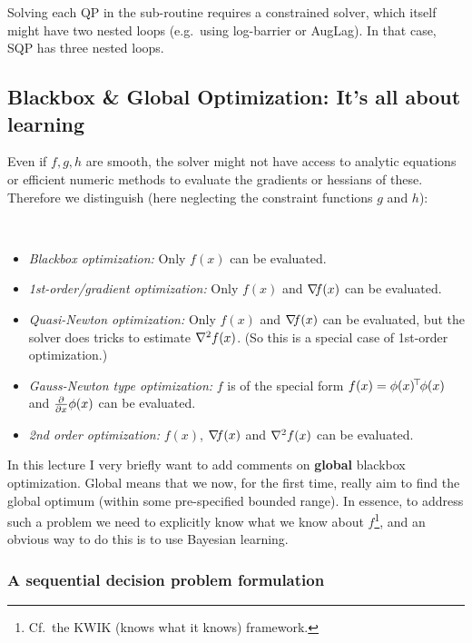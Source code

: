 Solving each QP in the sub-routine requires a constrained solver,
which itself might have two nested loops (e.g.\ using log-barrier or
AugLag). In that case, SQP has three nested loops.



\subsection{Blackbox \& Global Optimization: It's all about learning}

Even if $f,g,h$ are smooth, the solver might not have access to
analytic equations or efficient numeric methods to evaluate the
gradients or hessians of these. Therefore we distinguish (here
neglecting the constraint functions $g$ and $h$):
\begin{myDefinition}
~
\begin{itemize}
\item \emph{Blackbox optimization:} Only $f(x)$ can be evaluated.

\item \emph{1st-order/gradient optimization:} Only $f(x)$ and ${\nabla_{\!\!}} f(x)$ can be evaluated.

\item \emph{Quasi-Newton optimization:} Only $f(x)$ and ${\nabla_{\!\!}} f(x)$ can be
evaluated, but the solver does tricks to estimate ${\nabla_{\!\!}^2} f(x)$. (So this
is a special case of 1st-order optimization.)

\item \emph{Gauss-Newton type optimization:} $f$ is of the special
form $f(x) = \phi(x)^{\!\top\!} \phi(x)$ and $\frac{\partial}{\partial x}\phi(x)$ can be evaluated.

\item \emph{2nd order optimization:} $f(x)$, ${\nabla_{\!\!}} f(x)$ and ${\nabla_{\!\!}^2} f(x)$ can be
evaluated.
\end{itemize}
\end{myDefinition}

In this lecture I very briefly want to add comments on \textbf{global}
blackbox optimization. Global means that we now, for the first time,
really aim to find the global optimum (within some pre-specified
bounded range). In essence, to address such a problem we need to
explicitly know what we know about $f$\footnote{Cf.\ the KWIK (knows
what it knows) framework.}, and an obvious way to do this is to use
Bayesian learning.

\subsubsection{A sequential decision problem formulation}

